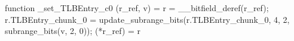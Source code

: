 function _set_TLBEntry_c0 (r_ref, v) = {
    r = __bitfield_deref(r_ref);
    r.TLBEntry_chunk_0 = update_subrange_bits(r.TLBEntry_chunk_0, 4, 2, subrange_bits(v, 2, 0));
    (*r_ref) = r
}
